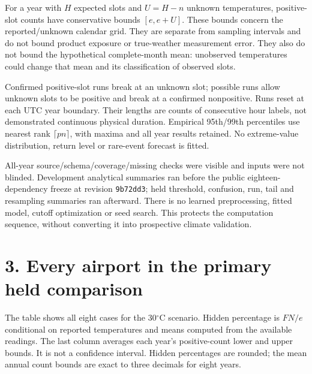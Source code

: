 \documentclass[10pt,letterpaper]{article}
\begin{document}
For a year with $H$ expected slots and $U=H-n$ unknown temperatures, positive-slot counts have conservative bounds $[e,e+U]$. These bounds concern the reported/unknown calendar grid. They are separate from sampling intervals and do not bound product exposure or true-weather measurement error. They also do not bound the hypothetical complete-month mean: unobserved temperatures could change that mean and its classification of observed slots.

Confirmed positive-slot runs break at an unknown slot; possible runs allow unknown slots to be positive and break at a confirmed nonpositive. Runs reset at each UTC year boundary. Their lengths are counts of consecutive hour labels, not demonstrated continuous physical duration. Empirical 95th/99th percentiles use nearest rank $\lceil pn\rceil$, with maxima and all year results retained. No extreme-value distribution, return level or rare-event forecast is fitted.

All-year source/schema/coverage/missing checks were visible and inputs were not blinded. Development analytical summaries ran before the public eighteen-dependency freeze at revision \texttt{9b72dd3}; held threshold, confusion, run, tail and resampling summaries ran afterward. There is no learned preprocessing, fitted model, cutoff optimization or seed search. This protects the computation sequence, without converting it into prospective climate validation.

\clearpage
\section*{3. Every airport in the primary held comparison}
The table shows all eight cases for the 30$^{\circ}$C scenario. Hidden percentage is $FN/e$ conditional on reported temperatures and means computed from the available readings. The last column averages each year's positive-count lower and upper bounds. It is not a confidence interval. Hidden percentages are rounded; the mean annual count bounds are exact to three decimals for eight years.
\end{document}
